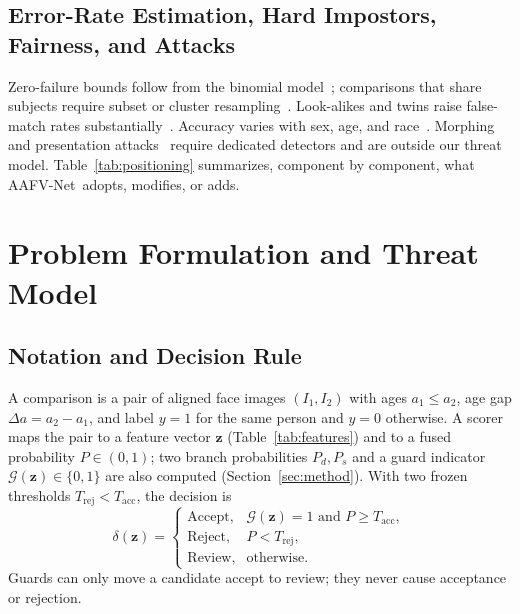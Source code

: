 \documentclass[journal]{IEEEtran}
\newcommand{\sys}{AAFV-Net}
\newcommand{\vect}[1]{\mathbf{#1}}
\begin{document}
\subsection{Error-Rate Estimation, Hard Impostors, Fairness, and Attacks}
Zero-failure bounds follow from the binomial model~\cite{clopper1934,hanley1983rule3}; comparisons that share subjects require subset or cluster resampling~\cite{bolle2004subsets,schuckers2010book}. Look-alikes and twins raise false-match rates substantially~\cite{paone2014twins}. Accuracy varies with sex, age, and race~\cite{klare2012demographics,grother2019frvt_part3,krishnapriya2020race}. Morphing and presentation attacks~\cite{scherhag2019morph,iso30107_3} require dedicated detectors and are outside our threat model. Table~\ref{tab:positioning} summarizes, component by component, what \sys\ adopts, modifies, or adds.



\section{Problem Formulation and Threat Model}
\label{sec:formulation}

\subsection{Notation and Decision Rule}
A comparison is a pair of aligned face images $(I_1,I_2)$ with ages $a_1\le a_2$, age gap $\Delta a=a_2-a_1$, and label $y=1$ for the same person and $y=0$ otherwise. A scorer maps the pair to a feature vector $\vect{z}$ (Table~\ref{tab:features}) and to a fused probability $P\in(0,1)$; two branch probabilities $P_d,P_s$ and a guard indicator $\mathcal{G}(\vect{z})\in\{0,1\}$ are also computed (Section~\ref{sec:method}). With two frozen thresholds $T_{\text{rej}}<T_{\text{acc}}$, the decision is
\begin{equation}
\label{eq:decision_rule}
\delta(\vect{z})=
\begin{cases}
\text{Accept}, & \mathcal{G}(\vect{z})=1 \text{ and } P\ge T_{\text{acc}},\\
\text{Reject}, & P< T_{\text{rej}},\\
\text{Review}, & \text{otherwise.}
\end{cases}
\end{equation}
Guards can only move a candidate accept to review; they never cause acceptance or rejection.
\end{document}
